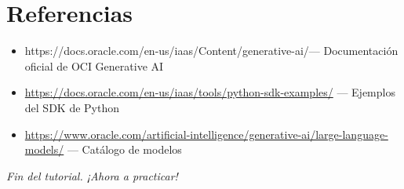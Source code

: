 \documentclass[11pt,a4paper,oneside]{article}
\newcommand{\ociurl}{https://docs.oracle.com/en-us/iaas/Content/generative-ai/}
\begin{document}
\section{Referencias}

\begin{itemize}
  \item \ociurl --- Documentación oficial de OCI Generative AI
  \item \url{https://docs.oracle.com/en-us/iaas/tools/python-sdk-examples/} --- Ejemplos del SDK de Python
  \item \url{https://www.oracle.com/artificial-intelligence/generative-ai/large-language-models/} --- Catálogo de modelos
\end{itemize}

\vspace{2em}
\begin{center}
\textit{Fin del tutorial. ¡Ahora a practicar!}
\end{center}
\end{document}

